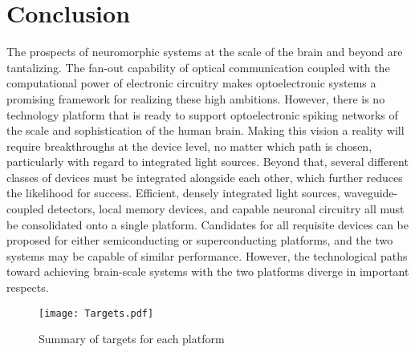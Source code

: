 \documentclass[twocolumn]{article}
\begin{document}
\section{\label{sec:conclusion}Conclusion}
The prospects of neuromorphic systems at the scale of the brain and beyond are tantalizing. The fan-out capability of optical communication coupled with the computational power of electronic circuitry makes optoelectronic systems a promising framework for realizing these high ambitions. However, there is no technology platform that is ready to support optoelectronic spiking networks of the scale and sophistication of the human brain. Making this vision a reality will require breakthroughs at the device level, no matter which path is chosen, particularly with regard to integrated light sources. Beyond that, several different classes of devices must be integrated alongside each other, which further reduces the likelihood for success. Efficient, densely integrated light sources, waveguide-coupled detectors, local memory devices, and capable neuronal circuitry all must be consolidated onto a single platform. Candidates for all requisite devices can be proposed for either semiconducting or superconducting platforms, and the two systems may be capable of similar performance. However, the technological paths toward achieving brain-scale systems with the two platforms diverge in important respects.


\begin{figure}[!h]
    \centering
    \texttt{[image: Targets.pdf]}
    \caption{Summary of targets for each platform}
    \label{fig:targets}
\end{figure}
\end{document}
